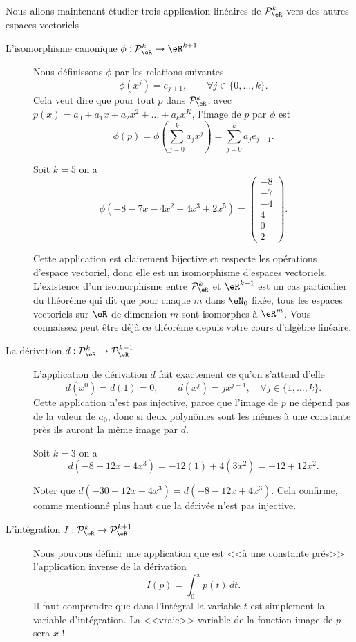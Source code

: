 Nous allons maintenant étudier trois application linéaires de $\mathcal{P}_\eR^k$ vers des autres espaces vectoriels
\begin{description}
  \item[L'isomorphisme canonique  $\phi:\mathcal{P}_\eR^k \to\eR^{k+1}$] Nous définissons $\phi$ par les relations suivantes
\[
\phi(x^j)=e_{j+1}, \qquad \forall j\in\{0,\dots, k\}. 
\]
Cela veut dire que pour tout $p$ dans $\mathcal{P}_\eR^k$, avec $p(x)=a_0+a_1 x +a_2 x^2 + \ldots+a_k x^K$, l'image de $p$ par $\phi$ est 
\[
\phi(p)=\phi\left(\sum_{j=0}^k a_j x^j\right)=\sum_{j=0}^k a_j e_{j+1}.
\]
\begin{example} Soit $k=5$ on a 
  \begin{equation}
    \phi(-8-7x-4x^2+4x^3+2x^5)=
  \begin{pmatrix}
    -8\\
    -7\\
    -4\\
    4\\
    0\\
    2
  \end{pmatrix}.
  \end{equation}
\end{example}

Cette application est clairement bijective et respecte les opérations d'espace vectoriel, donc elle est un isomorphisme d'espaces vectoriels. L'existence d'un isomorphisme entre $\mathcal{P}_\eR^k$  et $\eR^{k+1}$ est un cas particulier du théorème qui dit que  pour chaque $m$ dans $\eN_0$ fixée, tous les espaces vectoriels sur $\eR$ de dimension $m$ sont isomorphes à $\eR^m$. Vous connaissez peut être déjà ce théorème depuis votre cours d'algèbre linéaire.  
    \item[La dérivation $d: \mathcal{P}_\eR^k \to \mathcal{P}_\eR^{k-1}$] L'application de dérivation $d$ fait exactement ce qu'on s'attend d'elle 
\[
d(x^0)=d(1)=0, \qquad d(x^j)=j x^{j-1}, \quad \forall j\in\{1,\dots, k\}. 
\]
Cette application n'est pas injective, parce que l'image de $p$ ne dépend pas de la valeur de $a_0$, donc si deux polynômes sont les mêmes à une constante près ils auront la même image par $d$.

\begin{example} Soit $k=3$ on a 
  \begin{equation}
    d(-8-12x+4x^3)= -12 (1) + 4 (3x^2) = -12+12 x^2.
    \end{equation}

    Noter que $d(-30-12x+4x^3)=d(-8-12x+4x^3)$. Cela confirme, comme mentionné plus haut que la dérivée n'est pas injective.
\end{example}
      \item[L'intégration $I: \mathcal{P}_\eR^k \to \mathcal{P}_\eR^{k+1}$] Nous pouvons définir une application que est <<à une constante prés>> l'application inverse de la dérivation
        \begin{equation}
          I(p)= \int_0^x p(t) \,dt.
        \end{equation}
Il faut comprendre que dans l'intégral la variable $t$ est simplement la variable d'intégration. La <<vraie>> variable de la fonction image de $p$ sera $x$ !
 

\end{description}

